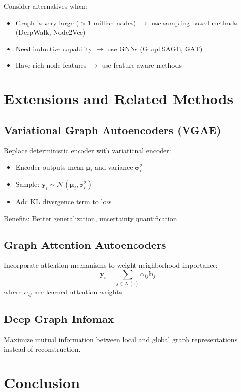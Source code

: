 \begin{notechapter}
Consider alternatives when:
\begin{itemize}
    \item Graph is very large ($>1$ million nodes) $\rightarrow$ use sampling-based methods (DeepWalk, Node2Vec)
    \item Need inductive capability $\rightarrow$ use GNNs (GraphSAGE, GAT)
    \item Have rich node features $\rightarrow$ use feature-aware methods
\end{itemize}

\section{Extensions and Related Methods}

\subsection{Variational Graph Autoencoders (VGAE)}

Replace deterministic encoder with variational encoder:
\begin{itemize}
    \item Encoder outputs mean $\bm{\mu}_i$ and variance $\bm{\sigma}_i^2$
    \item Sample: $\bm{y}_i \sim \mathcal{N}(\bm{\mu}_i, \bm{\sigma}_i^2)$
    \item Add KL divergence term to loss
\end{itemize}

Benefits: Better generalization, uncertainty quantification

\subsection{Graph Attention Autoencoders}

Incorporate attention mechanisms to weight neighborhood importance:
\[
\bm{y}_i = \sum_{j \in \mathcal{N}(i)} \alpha_{ij} \bm{h}_j
\]
where $\alpha_{ij}$ are learned attention weights.

\subsection{Deep Graph Infomax}

Maximize mutual information between local and global graph representations instead of reconstruction.

\section{Conclusion}


\end{notechapter}
